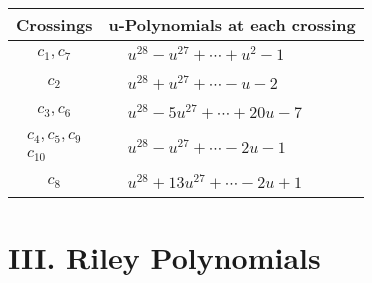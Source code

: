 \documentclass[1p]{elsarticle_modified}
\theoremstyle{definition}
\begin{document}
\begin{tabular}{m{50pt}|m{274pt}}
Crossings & \hspace{64pt}u-Polynomials at each crossing \\
\hline $$\begin{aligned}c_{1},c_{7}\end{aligned}$$&$\begin{aligned}
&u^{28}- u^{27}+\cdots+u^2-1
\end{aligned}$\\
\hline $$\begin{aligned}c_{2}\end{aligned}$$&$\begin{aligned}
&u^{28}+u^{27}+\cdots- u-2
\end{aligned}$\\
\hline $$\begin{aligned}c_{3},c_{6}\end{aligned}$$&$\begin{aligned}
&u^{28}-5 u^{27}+\cdots+20 u-7
\end{aligned}$\\
\hline $$\begin{aligned}c_{4},c_{5},c_{9}\\c_{10}\end{aligned}$$&$\begin{aligned}
&u^{28}- u^{27}+\cdots-2 u-1
\end{aligned}$\\
\hline $$\begin{aligned}c_{8}\end{aligned}$$&$\begin{aligned}
&u^{28}+13 u^{27}+\cdots-2 u+1
\end{aligned}$\\
\hline
\end{tabular}\newpage\renewcommand{\arraystretch}{1}
\centering \section*{ III. Riley Polynomials}
\end{document}
